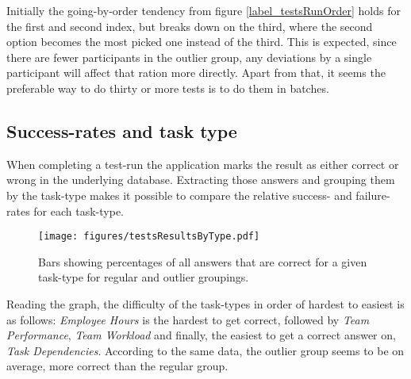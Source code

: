     Initially the going-by-order tendency from figure
    \ref{label_testsRunOrder} holds for the first and second index, but breaks down
    on the third, where the second option becomes the most picked one instead
    of the third. This is expected, since there are fewer participants in the
    outlier group, any deviations by a single participant will affect that
    ration more directly. Apart from that, it seems the preferable way to do
    thirty or more tests is to do them in batches.


%

  \subsection{Success-rates and task type}

    When completing a test-run the application marks the result as
    either correct or wrong in the underlying database. Extracting
    those answers and grouping them by the task-type makes it possible to
    compare the relative success- and failure-rates for each task-type.

    \begin{figure}[h!]
      \centering
      \texttt{[image: figures/testsResultsByType.pdf]}
      \caption{
        Bars showing percentages of all answers that are correct for a
        given task-type for regular and outlier groupings.
      }
    \end{figure}

    Reading the graph, the difficulty of the task-types in order of hardest
    to easiest is as follows: \textit{Employee Hours} is the hardest to get
    correct, followed by \textit{Team Performance}, \textit{Team Workload}
    and finally, the easiest to get a correct answer on, \textit{Task
      Dependencies}. According to the same data, the outlier group seems to
    be on average, more correct than the regular group.


